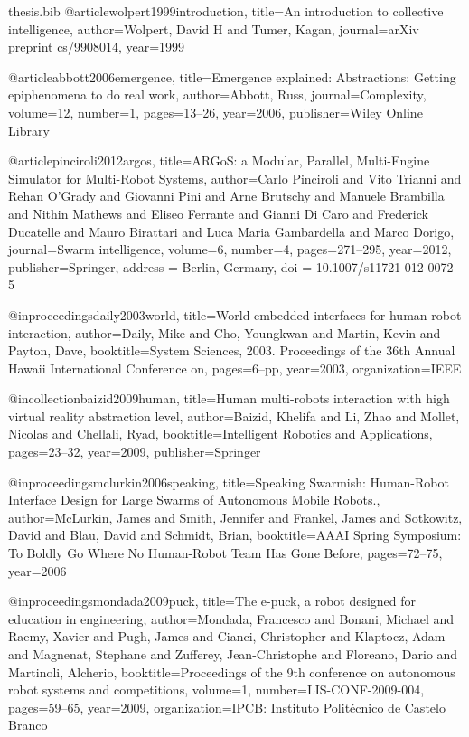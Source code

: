 \documentclass[oneside, a4paper, 12pt]{memoir}
\begin{document}
\begin{filecontents}{thesis.bib}
@article{wolpert1999introduction,
  title={An introduction to collective intelligence},
  author={Wolpert, David H and Tumer, Kagan},
  journal={arXiv preprint cs/9908014},
  year={1999}
}

@article{abbott2006emergence,
  title={Emergence explained: Abstractions: Getting epiphenomena to do real work},
  author={Abbott, Russ},
  journal={Complexity},
  volume={12},
  number={1},
  pages={13--26},
  year={2006},
  publisher={Wiley Online Library}
}

@article{pinciroli2012argos,
  title={{ARGoS}: a Modular, Parallel, Multi-Engine Simulator for Multi-Robot Systems},
  author={Carlo Pinciroli and Vito Trianni and Rehan O'Grady and Giovanni Pini and Arne Brutschy and Manuele Brambilla and Nithin Mathews and Eliseo Ferrante and Gianni {Di Caro} and Frederick Ducatelle and Mauro Birattari and Luca Maria Gambardella and Marco Dorigo},
  journal={Swarm intelligence},
  volume={6},
  number={4},
  pages={271--295},
  year={2012},
  publisher={Springer},
  address = {Berlin, Germany},
  doi = {10.1007/s11721-012-0072-5}
}

@inproceedings{daily2003world,
  title={World embedded interfaces for human-robot interaction},
  author={Daily, Mike and Cho, Youngkwan and Martin, Kevin and Payton, Dave},
  booktitle={System Sciences, 2003. Proceedings of the 36th Annual Hawaii International Conference on},
  pages={6--pp},
  year={2003},
  organization={IEEE}
}

@incollection{baizid2009human,
  title={Human multi-robots interaction with high virtual reality abstraction level},
  author={Baizid, Khelifa and Li, Zhao and Mollet, Nicolas and Chellali, Ryad},
  booktitle={Intelligent Robotics and Applications},
  pages={23--32},
  year={2009},
  publisher={Springer}
}

@inproceedings{mclurkin2006speaking,
  title={Speaking Swarmish: Human-Robot Interface Design for Large Swarms of Autonomous Mobile Robots.},
  author={McLurkin, James and Smith, Jennifer and Frankel, James and Sotkowitz, David and Blau, David and Schmidt, Brian},
  booktitle={AAAI Spring Symposium: To Boldly Go Where No Human-Robot Team Has Gone Before},
  pages={72--75},
  year={2006}
}

@inproceedings{mondada2009puck,
  title={The e-puck, a robot designed for education in engineering},
  author={Mondada, Francesco and Bonani, Michael and Raemy, Xavier and Pugh, James and Cianci, Christopher and Klaptocz, Adam and Magnenat, Stephane and Zufferey, Jean-Christophe and Floreano, Dario and Martinoli, Alcherio},
  booktitle={Proceedings of the 9th conference on autonomous robot systems and competitions},
  volume={1},
  number={LIS-CONF-2009-004},
  pages={59--65},
  year={2009},
  organization={IPCB: Instituto Polit{\'e}cnico de Castelo Branco}
}


\end{filecontents}
\end{document}
